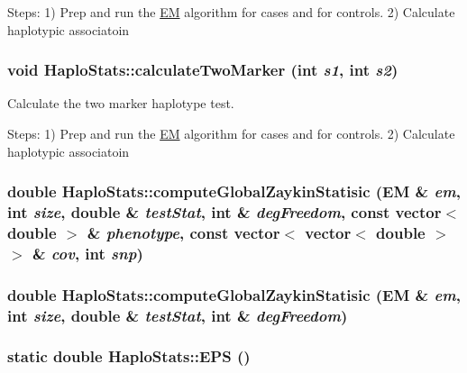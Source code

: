 Steps: 1) Prep and run the \hyperlink{classEM}{EM} algorithm for cases and for controls. 2) Calculate haplotypic associatoin \hypertarget{classHaploStats_a4eb4a1554f92c356d3d6bcb3f15a4daf}{
\subsubsection[{calculateTwoMarker}]{\setlength{\rightskip}{0pt plus 5cm}void HaploStats::calculateTwoMarker (int {\em s1}, \/  int {\em s2})}}
\label{classHaploStats_a4eb4a1554f92c356d3d6bcb3f15a4daf}
Calculate the two marker haplotype test.

Steps: 1) Prep and run the \hyperlink{classEM}{EM} algorithm for cases and for controls. 2) Calculate haplotypic associatoin \hypertarget{classHaploStats_a25999dcaac8dabc7a4c10a0992db61fb}{
\subsubsection[{computeGlobalZaykinStatisic}]{\setlength{\rightskip}{0pt plus 5cm}double HaploStats::computeGlobalZaykinStatisic ({\bf EM} \& {\em em}, \/  int {\em size}, \/  double \& {\em testStat}, \/  int \& {\em degFreedom}, \/  const vector$<$ double $>$ \& {\em phenotype}, \/  const vector$<$ vector$<$ double $>$ $>$ \& {\em cov}, \/  int {\em snp})}}
\label{classHaploStats_a25999dcaac8dabc7a4c10a0992db61fb}
\hypertarget{classHaploStats_a8f9a2f53316b3e76f350dbd68589ccb0}{
\subsubsection[{computeGlobalZaykinStatisic}]{\setlength{\rightskip}{0pt plus 5cm}double HaploStats::computeGlobalZaykinStatisic ({\bf EM} \& {\em em}, \/  int {\em size}, \/  double \& {\em testStat}, \/  int \& {\em degFreedom})}}
\label{classHaploStats_a8f9a2f53316b3e76f350dbd68589ccb0}
\hypertarget{classHaploStats_ad2719f7191d458bf72cf117b0d581aaa}{
\subsubsection[{EPS}]{\setlength{\rightskip}{0pt plus 5cm}static double HaploStats::EPS ()}}
\label{classHaploStats_ad2719f7191d458bf72cf117b0d581aaa}


